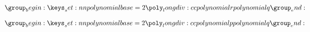 \documentclass{article}
\begin{document}


\[
  \PolyLongDiv[base=2]{r}{q}
  \]

\[
  \PolyLongDiv[base=2]{p}{q}
  \]
\end{document}
